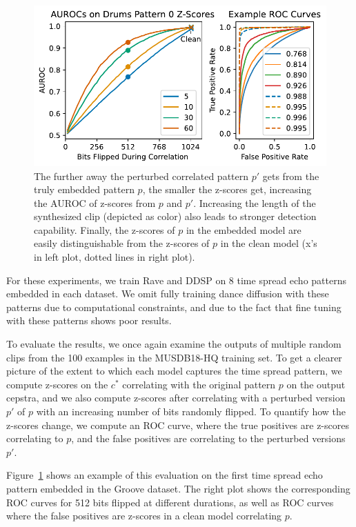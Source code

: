 \documentclass[letterpaper]{article} %
\begin{document}
\begin{figure}
    \centering
    \includegraphics[width=\columnwidth]{figs/DrumsPNModel_pn0.pdf}
    \caption{The further away the perturbed correlated pattern $p'$ gets from the truly embedded pattern $p$, the smaller the z-scores get, increasing the AUROC of z-scores from $p$ and $p'$.  Increasing the length of the synthesized clip (depicted as color) also leads to stronger detection capability.  Finally, the z-scores of $p$ in the embedded model are easily distinguishable from the z-scores of $p$ in the clean model (x's in left plot, dotted lines in right plot).}
    \label{fig:drumspn7}
\end{figure}

For these experiments, we train Rave and DDSP on 8 time spread echo patterns embedded in each dataset.  We omit fully training dance diffusion with these patterns due to computational constraints, and due to the fact that fine tuning with these patterns shows poor results.

To evaluate the results, we once again examine the outputs of multiple random clips from the 100 examples in the MUSDB18-HQ training set.  To get a clearer picture of the extent to which each model captures the time spread pattern, we compute z-scores on the $c^*$ correlating with the original pattern $p$ on the output cepstra, and we also compute z-scores after correlating with a perturbed version $p'$ of $p$ with an increasing number of bits randomly flipped.  To quantify how the z-scores change, we compute an ROC curve, where the true positives are z-scores correlating to $p$, and the false positives are correlating to the perturbed versions $p'$.  

Figure~\ref{fig:drumspn7} shows an example of this evaluation on the first time spread echo pattern embedded in the Groove dataset.  The right plot shows the corresponding ROC curves for 512 bits flipped at different durations, as well as ROC curves where the false positives are z-scores in a clean model correlating $p$.
\end{document}
